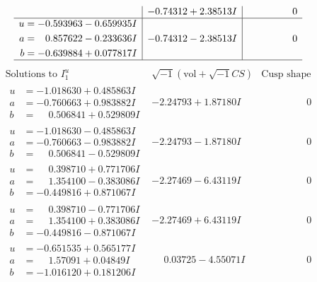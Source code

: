 \documentclass[1p]{elsarticle_modified}
\theoremstyle{definition}
\newcommand{\I}{\sqrt{-1}}
\begin{document}
$$\begin{array}{c|c|c}
 & -0.74312 + 2.38513 I & \phantom{-0.000000 } 0 \\ \hline\begin{aligned}
u &= -0.593963 - 0.659935 I \\
a &= \phantom{-}0.857622 - 0.233636 I \\
b &= -0.639884 + 0.077817 I\end{aligned}
 & -0.74312 - 2.38513 I & \phantom{-0.000000 } 0\\
 \hline 
 \end{array}$$\newpage$$\begin{array}{c|c|c}  
\text{Solutions to }I^u_{1}& \I (\text{vol} + \sqrt{-1}CS) & \text{Cusp shape}\\
 \hline 
\begin{aligned}
u &= -1.018630 + 0.485863 I \\
a &= -0.760663 + 0.983882 I \\
b &= \phantom{-}0.506841 + 0.529809 I\end{aligned}
 & -2.24793 + 1.87180 I & \phantom{-0.000000 } 0 \\ \hline\begin{aligned}
u &= -1.018630 - 0.485863 I \\
a &= -0.760663 - 0.983882 I \\
b &= \phantom{-}0.506841 - 0.529809 I\end{aligned}
 & -2.24793 - 1.87180 I & \phantom{-0.000000 } 0 \\ \hline\begin{aligned}
u &= \phantom{-}0.398710 + 0.771706 I \\
a &= \phantom{-}1.354100 - 0.383086 I \\
b &= -0.449816 + 0.871067 I\end{aligned}
 & -2.27469 - 6.43119 I & \phantom{-0.000000 } 0 \\ \hline\begin{aligned}
u &= \phantom{-}0.398710 - 0.771706 I \\
a &= \phantom{-}1.354100 + 0.383086 I \\
b &= -0.449816 - 0.871067 I\end{aligned}
 & -2.27469 + 6.43119 I & \phantom{-0.000000 } 0 \\ \hline\begin{aligned}
u &= -0.651535 + 0.565177 I \\
a &= \phantom{-}1.57091 + 0.04849 I \\
b &= -1.016120 + 0.181206 I\end{aligned}
 & \phantom{-}0.03725 - 4.55071 I & \phantom{-0.000000 } 0 \\ \hline\begin{aligned}

\end{aligned}
\end{array}$$
\end{document}
